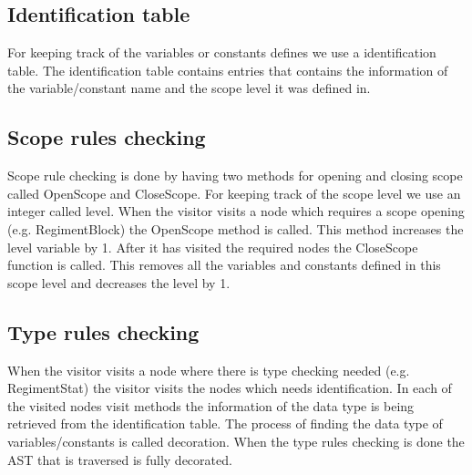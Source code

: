 	\subsection{Identification table}
		For keeping track of the variables or constants defines we use a identification table. The identification table contains entries
		that contains the information of the variable/constant name and the scope level it was defined in.
		
	\subsection{Scope rules checking}
		Scope rule checking is done by having two methods for opening and closing scope called OpenScope and CloseScope. 
		For keeping track of the scope level we use an integer called level.
		When the visitor visits a node which requires a scope opening (e.g. RegimentBlock) the OpenScope method is called. 
		This method increases the level variable by 1. After it has visited the required nodes the CloseScope function is called. 
		This removes all the variables and constants defined in this scope level and decreases the level by 1.
	
	\subsection{Type rules checking}
		When the visitor visits a node where there is type checking needed (e.g. RegimentStat) the visitor visits the nodes 
		which needs identification. In each of the visited nodes visit methods the information of the data type is being retrieved 
		from the identification table. The process of finding the data type of variables/constants is called decoration. 
		When the type rules checking is done the AST that is traversed is fully decorated.
		
		